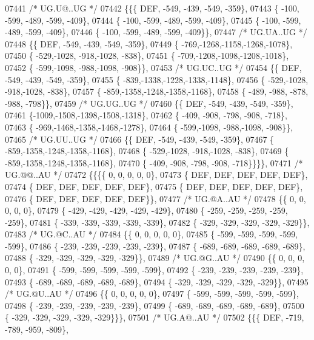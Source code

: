 \begin{DoxyCode}
07441 \textcolor{comment}{/* UG.U@..UG */}
07442 \{\{\{  DEF, -549, -439, -549, -359\},
07443 \{ -100, -599, -489, -599, -409\},
07444 \{ -100, -599, -489, -599, -409\},
07445 \{ -100, -599, -489, -599, -409\},
07446 \{ -100, -599, -489, -599, -409\}\},
07447 \textcolor{comment}{/* UG.UA..UG */}
07448 \{\{  DEF, -549, -439, -549, -359\},
07449 \{ -769,-1268,-1158,-1268,-1078\},
07450 \{ -529,-1028, -918,-1028, -838\},
07451 \{ -709,-1208,-1098,-1208,-1018\},
07452 \{ -599,-1098, -988,-1098, -908\}\},
07453 \textcolor{comment}{/* UG.UC..UG */}
07454 \{\{  DEF, -549, -439, -549, -359\},
07455 \{ -839,-1338,-1228,-1338,-1148\},
07456 \{ -529,-1028, -918,-1028, -838\},
07457 \{ -859,-1358,-1248,-1358,-1168\},
07458 \{ -489, -988, -878, -988, -798\}\},
07459 \textcolor{comment}{/* UG.UG..UG */}
07460 \{\{  DEF, -549, -439, -549, -359\},
07461 \{-1009,-1508,-1398,-1508,-1318\},
07462 \{ -409, -908, -798, -908, -718\},
07463 \{ -969,-1468,-1358,-1468,-1278\},
07464 \{ -599,-1098, -988,-1098, -908\}\},
07465 \textcolor{comment}{/* UG.UU..UG */}
07466 \{\{  DEF, -549, -439, -549, -359\},
07467 \{ -859,-1358,-1248,-1358,-1168\},
07468 \{ -529,-1028, -918,-1028, -838\},
07469 \{ -859,-1358,-1248,-1358,-1168\},
07470 \{ -409, -908, -798, -908, -718\}\}\}\},
07471 \textcolor{comment}{/* UG.@@..AU */}
07472 \{\{\{\{    0,    0,    0,    0,    0\},
07473 \{  DEF,  DEF,  DEF,  DEF,  DEF\},
07474 \{  DEF,  DEF,  DEF,  DEF,  DEF\},
07475 \{  DEF,  DEF,  DEF,  DEF,  DEF\},
07476 \{  DEF,  DEF,  DEF,  DEF,  DEF\}\},
07477 \textcolor{comment}{/* UG.@A..AU */}
07478 \{\{    0,    0,    0,    0,    0\},
07479 \{ -429, -429, -429, -429, -429\},
07480 \{ -259, -259, -259, -259, -259\},
07481 \{ -339, -339, -339, -339, -339\},
07482 \{ -329, -329, -329, -329, -329\}\},
07483 \textcolor{comment}{/* UG.@C..AU */}
07484 \{\{    0,    0,    0,    0,    0\},
07485 \{ -599, -599, -599, -599, -599\},
07486 \{ -239, -239, -239, -239, -239\},
07487 \{ -689, -689, -689, -689, -689\},
07488 \{ -329, -329, -329, -329, -329\}\},
07489 \textcolor{comment}{/* UG.@G..AU */}
07490 \{\{    0,    0,    0,    0,    0\},
07491 \{ -599, -599, -599, -599, -599\},
07492 \{ -239, -239, -239, -239, -239\},
07493 \{ -689, -689, -689, -689, -689\},
07494 \{ -329, -329, -329, -329, -329\}\},
07495 \textcolor{comment}{/* UG.@U..AU */}
07496 \{\{    0,    0,    0,    0,    0\},
07497 \{ -599, -599, -599, -599, -599\},
07498 \{ -239, -239, -239, -239, -239\},
07499 \{ -689, -689, -689, -689, -689\},
07500 \{ -329, -329, -329, -329, -329\}\}\},
07501 \textcolor{comment}{/* UG.A@..AU */}
07502 \{\{\{  DEF, -719, -789, -959, -809\},

\end{DoxyCode}
